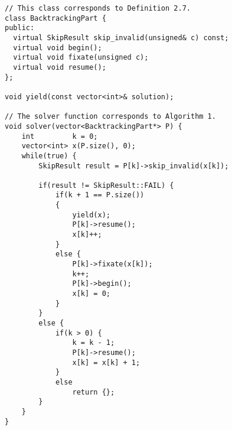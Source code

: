 \begin{lstlisting}[language=MyCpp,
                   label={cppsolver},caption=
  {Complete C++ implementation of \Cref{backtrackalg}:
    The if-else statements in lines 19--41 precisely correspond to those
    in lines 5--17 of that algorithm.
    The \texttt{BacktrackingPart} objects iterate over $\protect{B_k[C](M,x)}$ via the
    \texttt{skip\_invalid} method.
    The remaining member function calls in lines
    $\text{23},\text{27},\text{29},\text{36}$ precompute structures that are
    used in \texttt{skip\_invalid} for quick evaluation.\parfillskip=0pt}]
// This class corresponds to Definition 2.7.
class BacktrackingPart {
public:
  virtual SkipResult skip_invalid(unsigned& c) const;
  virtual void begin();
  virtual void fixate(unsigned c);
  virtual void resume();
};

void yield(const vector<int>& solution);

// The solver function corresponds to Algorithm 1.
void solver(vector<BacktrackingPart*> P) {
    int         k = 0;
    vector<int> x(P.size(), 0);
    while(true) {
        SkipResult result = P[k]->skip_invalid(x[k]);

        if(result != SkipResult::FAIL) {
            if(k + 1 == P.size())
            {
                yield(x);
                P[k]->resume();
                x[k]++;
            }
            else {
                P[k]->fixate(x[k]);
                k++;
                P[k]->begin();
                x[k] = 0;
            }
        }
        else {
            if(k > 0) {
                k = k - 1;
                P[k]->resume();
                x[k] = x[k] + 1;
            }
            else
                return {};
        }
    }
}
\end{lstlisting}
